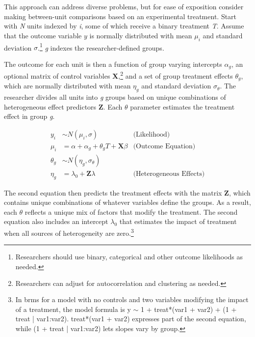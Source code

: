\documentclass[12pt]{article}
\begin{document}
This approach can address diverse problems, but for ease of exposition consider making between-unit comparisons based on an experimental treatment.    
Start with \textit{N} units indexed by \textit{i}, some of which receive a binary treatment \textit{T}.
Assume that the outcome variable ${y}$ is normally distributed with mean $\mu_i$ and standard deviation $\sigma$.\footnote{Researchers should use binary, categorical and other outcome likelihoods as needed.}
\textit{g} indexes the researcher-defined groups. 


The outcome for each unit is then a function of group varying intercepts $\alpha_g$, an optional matrix of control variables \textbf{X},\footnote{Researchers can adjust for autocorrelation and clustering as needed.} and a set of group treatment effects $\theta_g$, which are normally distributed with mean $\eta_g$ and standard deviation $\sigma_\theta$. 
The researcher divides all units into \textit{g} groups based on unique combinations of heterogeneous effect predictors \textbf{Z}. 
Each $\theta$ parameter estimates the treatment effect in group \textit{g}.%


\begin{equation}
\begin{aligned}
y_i &\sim N(\mu_i, \sigma) &\text{(Likelihood)} \\
\mu_i &= \alpha + \alpha_g + \theta_g \textit{T} + \textbf{X} \beta &\text{(Outcome Equation)}  \\
\theta_g &\sim N(\eta_g, \sigma_\theta) \\ 
\eta_g &= \lambda_0 + \textbf{Z} \lambda &\text{(Heterogeneous Effects)} 
\end{aligned}
\end{equation}


The second equation then predicts the treatment effects with the matrix \textbf{Z}, which contains unique combinations of whatever variables define the groups.  
As a result, each $\theta$ reflects a unique mix of factors that modify the treatment.
The second equation also includes an intercept $\lambda_0$ that estimates the impact of treatment when all sources of heterogeneity are zero.\footnote{In brms for a model with no controls and two variables modifying the impact of a treatment, the model formula is y $\sim$ 1 + treat*(var1 + var2) + (1 + treat | var1:var2). treat*(var1 + var2) expresses part of the second equation, while (1 + treat | var1:var2) lets slopes vary by group.}
\end{document}
